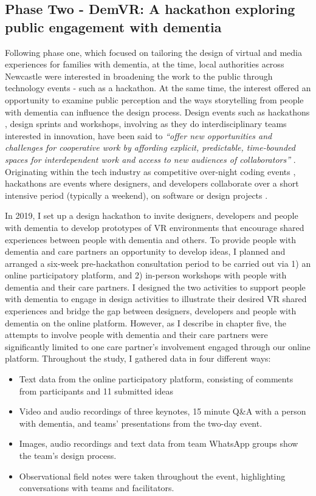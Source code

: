 \subsection{Phase Two - DemVR: A hackathon exploring public engagement with dementia}

Following phase one, which focused on tailoring the design of virtual and media experiences for families with dementia, at the time, local authorities across Newcastle were interested in broadening the work to the public through technology events - such as a hackathon. At the same time, the interest offered an opportunity to examine public perception and the ways storytelling from people with dementia can influence the design process. Design events such as hackathons \citep{olesen_what_2021}, design sprints and workshops, involving as they do interdisciplinary teams interested in innovation, have been said to \textit{``offer new opportunities and challenges for cooperative work by affording explicit, predictable, time-bounded spaces for interdependent work and access to new audiences of collaborators''} \citep{filippova_hacking_2017}. Originating within the tech industry as competitive over-night coding events \citep{jones_theres_2015}, hackathons are events where designers, and developers collaborate over a short intensive period (typically a weekend), on software or design projects \citep{nandi_hackathons_2016}. 

In 2019, I set up a design hackathon to invite designers, developers and people with dementia to develop prototypes of VR environments that encourage shared experiences between people with dementia and others. To provide people with dementia and care partners an opportunity to develop ideas, I planned and arranged a six-week pre-hackathon consultation period to be carried out via 1) an online participatory platform, and 2) in-person workshops with people with dementia and their care partners. I designed the two activities to support people with dementia to engage in design activities to illustrate their desired VR shared experiences and bridge the gap between designers, developers and people with dementia on the online platform. However, as I describe in chapter five, the attempts to involve people with dementia and their care partners were significantly limited to one care partner's involvement engaged through our online platform. Throughout the study, I gathered data in four different ways:
\begin{itemize}
    \item Text data from the online participatory platform, consisting of comments from participants and 11 submitted ideas
    \item Video and audio recordings of three keynotes, 15 minute Q\&A with a person with dementia, and teams' presentations from the two-day event.
    \item Images, audio recordings and text data from team WhatsApp groups show the team's design process.
    \item Observational field notes were taken throughout the event, highlighting conversations with teams and facilitators.
\end{itemize}

